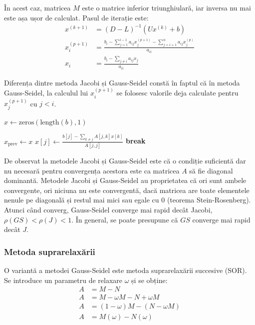\documentclass{exam}
\begin{document}
În acest caz, matricea $M$ este o matrice inferior triunghiulară, iar inversa
nu mai este așa ușor de calculat. Pasul de iterație este:
\begin{align*}
	x^{(k + 1)} & = (D - L)^{-1}(Ux^{(k)} + b)                                                                         \\
	x_i^{(p+1)} & = \frac{b_i - \sum_{j = 1}^{i-1} a_{ij} x_j^{(p+1)} - \sum_{j = i + 1}^{n} a_{ij} x_j^{(p)}}{a_{ii}} \\
	x_i         & = \frac{b_i - \sum_{j \neq i}^{} a_{ij} x_j}{a_{ii}}
\end{align*}

Diferența dintre metoda Jacobi și Gauss-Seidel constă în faptul că în metoda
Gauss-Seidel, la calculul lui $x_i^{(p+1)}$ se folosesc valorile deja calculate
pentru $x_j^{(p+1)}$ cu $j < i$.


\begin{algorithm}
	\caption{Metoda Gauss-Seidel}
	\begin{algorithmic}[1]
		\State \( x \gets \text{zeros}(\text{length}(b),1) \) 

		\State \( x_{\text{prev}} \gets x \)
		\State \( x[j] \gets \frac{b[j] - \sum_{k \neq j}^{} A[j,k] x[k]}{A[j,j]} \)
		\EndFor
		\State \textbf{break}
		\EndIf
		\EndFor
	\end{algorithmic}
\end{algorithm}

De observat la metodele Jacobi și Gauss-Seidel este că o condiție suficientă dar
nu necesară pentru convergența acestora este ca matricea $A$ să fie diagonal
dominantă. Metodele Jacobi și Gauss-Seidel au proprietatea că ori sunt ambele
convergente, ori niciuna nu este convergentă, dacă matricea are toate elementele
nenule pe diagonală și restul mai mici sau egale cu 0 (teorema Stein-Rosenberg).
Atunci când converg, Gauss-Seidel converge mai rapid decât Jacobi,
$\rho(GS) < \rho(J) < 1$. În general, se poate presupune că $GS$ converge
mai rapid decât $J$.

\subsubsection{Metoda suprarelaxării}

O variantă a metodei Gauss-Seidel este metoda suprarelaxării succesive (SOR).
Se introduce un parametru de relaxare $\omega$ și se obține:
\begin{align*}
	A & = M - N                           \\
	A & = M - \omega M - N + \omega M     \\
	A & = (1 - \omega) M - (N - \omega M) \\
	A & = M(\omega) - N(\omega)
\end{align*}
\end{document}
